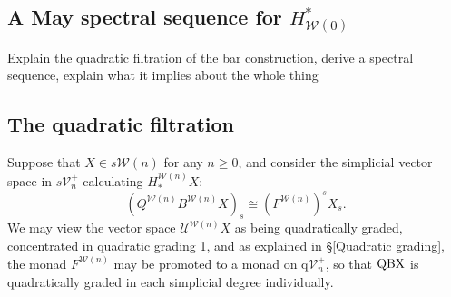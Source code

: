 \documentclass[11pt]{amsart} \renewcommand{\baselinestretch}{1.2}
\theoremstyle{plain}
\theoremstyle{definition}
\newcommand{\calW}{\mathcal{W}}
\newcommand{\calU}{\mathcal{U}}
\newcommand{\calV}{\mathcal{V}}
\newcommand{\calw}{\mathcal{W}}
\newcommand{\vect}[2]{\calV^{#1}_{#2}}
\newcommand{\quadgrad}[1]{\mathrm{q}_{#1}}
\begin{document}
\begin{May sseq and vanishing line}
\section{\textbf{A May spectral sequence for $H^*_{\calw(0)}$}}
\label{May sseq and vanishing line}
{Explain the quadratic filtration of the bar construction, derive a spectral sequence, explain what it implies about the whole thing}

\subsection{The quadratic filtration}

Suppose that $X\in s\calw(n)$ for any $n\geq0$, and consider the simplicial vector space in $s\vect{+}{n}$ calculating $H_*^{\calw(n)}X$:
\[(Q^{\calw(n)}B^{\calw(n)}X)_s\cong (F^{\calw(n)})^{s}X_{s}.\] We may view the vector space $\calU^{\calw(n)}X$ as being quadratically graded, concentrated in quadratic grading 1, and as explained in \S\ref{Quadratic grading}, the monad $F^{\calW(n)}$ may be promoted to a monad on $\quadgrad{}\vect{+}{n}$, so that $\textup{QBX}$ is quadratically graded in each simplicial degree individually.


\end{May sseq and vanishing line}
\end{document}
